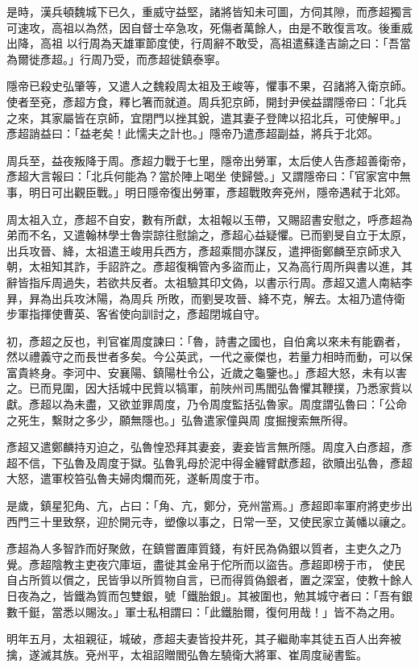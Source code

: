 \begin{pinyinscope}
 是時，漢兵頓魏城下已久，重威守益堅，諸將皆知未可圖，方伺其隙，而彥超獨言可速攻，高祖以為然，因自督士卒急攻，死傷者萬餘人，由是不敢復言攻。後重威出降，高祖
 以行周為天雄軍節度使，行周辭不敢受，高祖遣蘇逢吉諭之曰：「吾當為爾徙彥超。」行周乃受，而彥超徙鎮泰寧。



 隱帝已殺史弘肇等，又遣人之魏殺周太祖及王峻等，懼事不果，召諸將入衛京師。使者至兗，彥超方食，釋匕箸而就道。周兵犯京師，開封尹侯益謂隱帝曰：「北兵之來，其家屬皆在京師，宜閉門以挫其銳，遣其妻子登陴以招北兵，可使解甲。」彥超誚益曰：「益老矣！此懦夫之計也。」隱帝乃遣彥超副益，將兵于北郊。



 周兵至，益夜叛降于周。彥超力戰于七里，隱帝出勞軍，太后使人告彥超善衛帝，彥超大言報曰：「北兵何能為？當於陣上喝坐
 使歸營。」又謂隱帝曰：「官家宮中無事，明日可出觀臣戰。」明日隱帝復出勞軍，彥超戰敗奔兗州，隱帝遇弒于北郊。



 周太祖入立，彥超不自安，數有所獻，太祖報以玉帶，又賜詔書安慰之，呼彥超為弟而不名，又遣翰林學士魯崇諒往慰諭之，彥超心益疑懼。已而劉旻自立于太原，出兵攻晉、絳，太祖遣王峻用兵西方，彥超乘間亦謀反，遣押衙鄭麟至京師求入朝，太祖知其詐，手詔許之。彥超復稱管內多盜而止，又為高行周所與書以進，其辭皆指斥周過失，若欲共反者。太祖驗其印文偽，以書示行周。彥超又遣人南結李昪，昪為出兵攻沐陽，為周兵
 所敗，而劉旻攻晉、絳不克，解去。太祖乃遣侍衛步軍指揮使曹英、客省使向訓討之，彥超閉城自守。



 初，彥超之反也，判官崔周度諫曰：「魯，詩書之國也，自伯禽以來未有能霸者，然以禮義守之而長世者多矣。今公英武，一代之豪傑也，若量力相時而動，可以保富貴終身。李河中、安襄陽、鎮陽杜令公，近歲之龜鑒也。」彥超大怒，未有以害之。已而見圍，因大括城中民貲以犒軍，前陜州司馬閻弘魯懼其鞭撲，乃悉家貲以獻。彥超以為未盡，又欲並罪周度，乃令周度監括弘魯家。周度謂弘魯曰：「公命之死生，繫財之多少，願無隱也。」弘魯遣家僮與周
 度掘搜索無所得。



 彥超又遣鄭麟持刃迫之，弘魯惶恐拜其妻妾，妻妾皆言無所隱。周度入白彥超，彥超不信，下弘魯及周度于獄。弘魯乳母於泥中得金纏臂獻彥超，欲贖出弘魯，彥超大怒，遣軍校笞弘魯夫婦肉爛而死，遂斬周度于市。



 是歲，鎮星犯角、亢，占曰：「角、亢，鄭分，兗州當焉。」彥超即率軍府將吏步出西門三十里致祭，迎於開元寺，塑像以事之，日常一至，又使民家立黃幡以禳之。



 彥超為人多智詐而好聚斂，在鎮嘗置庫質錢，有奸民為偽銀以質者，主吏久之乃覺。彥超陰教主吏夜穴庫垣，盡徙其金帛于佗所而以盜告。彥超即榜于市，
 使民自占所質以償之，民皆爭以所質物自言，已而得質偽銀者，置之深室，使教十餘人日夜為之，皆鐵為質而包雙銀，號「鐵胎銀」。其被圍也，勉其城守者曰：「吾有銀數千鋌，當悉以賜汝。」軍士私相謂曰：「此鐵胎爾，復何用哉！」皆不為之用。



 明年五月，太祖親征，城破，彥超夫妻皆投井死，其子繼勛率其徒五百人出奔被擒，遂滅其族。兗州平，太祖詔贈閻弘魯左驍衛大將軍、崔周度祕書監。



\end{pinyinscope}